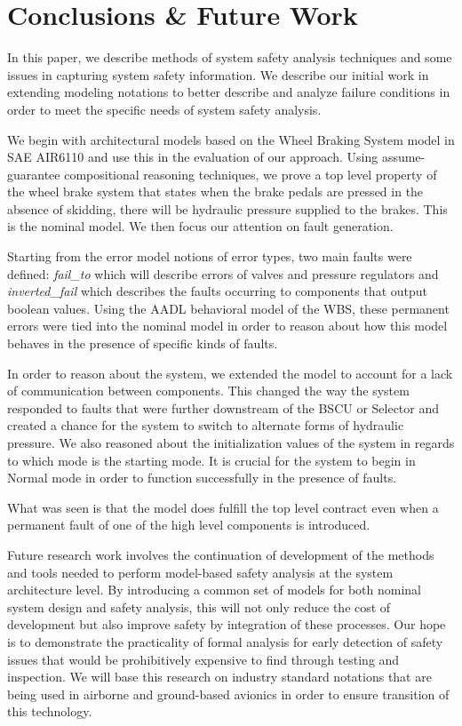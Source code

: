 \section{Conclusions \& Future Work}
In this paper, we describe methods of system safety analysis techniques and some issues in capturing system safety information. We describe our initial work in extending modeling notations to better describe and analyze failure conditions in order to meet the specific needs of system safety analysis. 

We begin with architectural models based on the Wheel Braking System model in SAE AIR6110 and use this in the evaluation of our approach. Using assume-guarantee compositional reasoning techniques, we prove a top level property of the wheel brake system that states when the brake pedals are pressed in the absence of skidding, there will be hydraulic pressure supplied to the brakes. This is the nominal model. We then focus our attention on fault generation. 

Starting from the error model notions of error types, two main faults were defined: \textit{fail\_to} which will describe errors of valves and pressure regulators and \textit{inverted\_fail} which describes the faults occurring to components that output boolean values. Using the AADL behavioral model of the WBS, these permanent errors were tied into the nominal model in order to reason about how this model behaves in the presence of specific kinds of faults. 

In order to reason about the system, we extended the model to account for a lack of communication between components. This changed the way the system responded to faults that were further downstream of the BSCU or Selector and created a chance for the system to switch to alternate forms of hydraulic pressure. We also reasoned about the initialization values of the system in regards to which mode is the starting mode. It is crucial for the system to begin in Normal mode in order to function successfully in the presence of faults. 

What was seen is that the model does fulfill the top level contract even when a permanent fault of one of the high level components is introduced. 

Future research work involves the continuation of development of the methods and tools needed to perform model-based safety analysis at the system architecture level. By introducing a common set of models for both nominal system design and safety analysis, this will not only reduce the cost of development but also improve safety by integration of these processes. Our hope is to demonstrate the practicality of formal analysis for early detection of safety issues that would be prohibitively expensive to find through testing and inspection. We will base this research on industry standard notations that are being used in airborne and ground-based avionics in order to ensure transition of this technology. 




